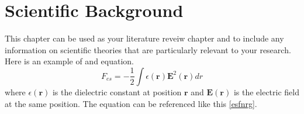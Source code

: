 \chapter{Scientific Background}

This chapter can be used as your literature reveiw chapter and to include any
information on scientific theories that are particularly relevant to your
research. Here is an example of and equation.
%
\begin{equation}
    F_{es} = -\frac{1}{2} \int \epsilon(\mathbf{r}) \mathbf{E}^2(\mathbf{r}) dr
    \label{esfnrg}
\end{equation}
%
where $\epsilon(\mathbf{r})$ is the dielectric constant at position
$\mathbf{r}$ and $\mathbf{E}(\mathbf{r})$ is the electric field at the same
position. The equation can be referenced like this \ref{esfnrg}.
